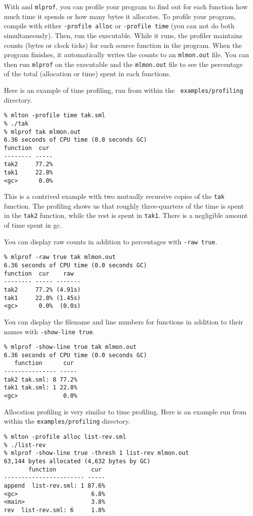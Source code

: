 
With {\mlton} and {\tt mlprof}, you can profile your program to find
out for each function how much time it spends or how many bytes it
allocates.  To profile your program, compile with either {\tt -profile
alloc} or {\tt -profile time} (you can not do both simultaneously).
Then, run the executable.  While it runs, the profiler maintains
counts (bytes or clock ticks) for each source function in the program.
When the program finishes, it automatically writes the counts to an
{\tt mlmon.out} file.  You can then run {\tt mlprof} on the executable
and the {\tt mlmon.out} file to see the percentage of the total
(allocation or time) spent in each functions.

Here is an example of time profiling, run from within the {\tt
examples/profiling} directory.
\begin{verbatim}
% mlton -profile time tak.sml
% ./tak
% mlprof tak mlmon.out
6.36 seconds of CPU time (0.0 seconds GC)
function  cur 
-------- -----
tak2     77.2%
tak1     22.8%
<gc>      0.0%
\end{verbatim}
This is a contrived example with two mutually recursive copies of the
{\tt tak} function.  The profiling shows us that roughly
three-quarters of the time is spent in the {\tt tak2} function, while
the rest is spent in {\tt tak1}.  There is a negligible amount of time
spent in gc.

You can display raw counts in addition to percentages with {\tt -raw
true}.
\begin{verbatim}
% mlprof -raw true tak mlmon.out
6.36 seconds of CPU time (0.0 seconds GC)
function  cur    raw  
-------- ----- -------
tak2     77.2% (4.91s)
tak1     22.8% (1.45s)
<gc>      0.0%  (0.0s)
\end{verbatim}

You can display the filename and line numbers for functions in addition
to their names with {\tt -show-line true}.
\begin{verbatim}
% mlprof -show-line true tak mlmon.out
6.36 seconds of CPU time (0.0 seconds GC)
   function      cur 
--------------- -----
tak2 tak.sml: 8 77.2%
tak1 tak.sml: 1 22.8%
<gc>             0.0%
\end{verbatim}

Allocation profiling is very similar to time profiling.  Here is an
example run from within the {\tt examples/profiling} directory.

\begin{verbatim}
% mlton -profile alloc list-rev.sml
% ./list-rev
% mlprof -show-line true -thresh 1 list-rev mlmon.out
63,144 bytes allocated (4,632 bytes by GC)
       function          cur 
----------------------- -----
append  list-rev.sml: 1 87.6%
<gc>                     6.8%
<main>                   3.8%
rev  list-rev.sml: 6     1.8%
\end{verbatim}

